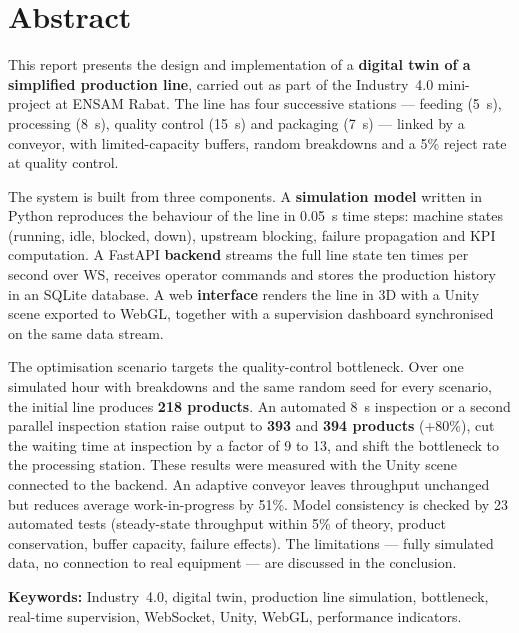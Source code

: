 \vspace{1.2cm}

\chapter*{Abstract}
\thispagestyle{plain}

This report presents the design and implementation of a \textbf{digital twin of a simplified production line}, carried out as part of the Industry~4.0 mini-project at \ac{ENSAM} Rabat. The line has four successive stations --- feeding (5~s), processing (8~s), quality control (15~s) and packaging (7~s) --- linked by a conveyor, with limited-capacity buffers, random breakdowns and a 5\% reject rate at quality control.

The system is built from three components. A \textbf{simulation model} written in Python reproduces the behaviour of the line in 0.05~s time steps: machine states (running, idle, blocked, down), upstream blocking, failure propagation and \ac{KPI} computation. A FastAPI \textbf{backend} streams the full line state ten times per second over \ac{WS}, receives operator commands and stores the production history in an SQLite database. A web \textbf{interface} renders the line in \ac{3D} with a Unity scene exported to WebGL, together with a supervision dashboard synchronised on the same data stream.

The optimisation scenario targets the quality-control bottleneck. Over one simulated hour with breakdowns and the same random seed for every scenario, the initial line produces \textbf{218 products}. An automated 8~s inspection or a second parallel inspection station raise output to \textbf{393} and \textbf{394 products} (+80\%), cut the waiting time at inspection by a factor of 9 to 13, and shift the bottleneck to the processing station. These results were measured with the Unity scene connected to the backend. An adaptive conveyor leaves throughput unchanged but reduces average work-in-progress by 51\%. Model consistency is checked by 23 automated tests (steady-state throughput within 5\% of theory, product conservation, buffer capacity, failure effects). The limitations --- fully simulated data, no connection to real equipment --- are discussed in the conclusion.

\vspace{0.4cm}
\textbf{Keywords:} Industry~4.0, digital twin, production line simulation, bottleneck, real-time supervision, WebSocket, Unity, WebGL, performance indicators.
